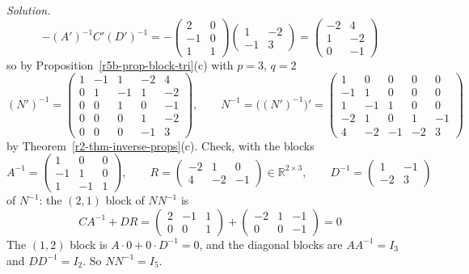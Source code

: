 \documentclass[12pt]{article}
\newcommand{\R}{\mathbb R}
\theoremstyle{definition}
\newenvironment{solution}{\par\noindent\textit{Solution.}\ }{\par\smallskip}
\begin{document}
\begin{solution}
\[-(A')^{-1}C'(D')^{-1}=-\begin{pmatrix}2&0\\-1&0\\1&1\end{pmatrix}\begin{pmatrix}1&-2\\-1&3\end{pmatrix}
=\begin{pmatrix}-2&4\\1&-2\\0&-1\end{pmatrix}
\]
so by Proposition~\ref{r5b-prop-block-tri}(c) with \(p=3\), \(q=2\)
\[
(N')^{-1}=\left(\begin{array}{ccc|cc}1&-1&1&-2&4\\0&1&-1&1&-2\\0&0&1&0&-1\\\hline0&0&0&1&-2\\0&0&0&-1&3\end{array}\right),\qquad
N^{-1}=\bigl((N')^{-1}\bigr)'=\left(\begin{array}{ccc|cc}1&0&0&0&0\\-1&1&0&0&0\\1&-1&1&0&0\\\hline-2&1&0&1&-1\\4&-2&-1&-2&3\end{array}\right)
\]
by Theorem~\ref{r2-thm-inverse-props}(c). Check, with the blocks
\[
A^{-1}=\begin{pmatrix}1&0&0\\-1&1&0\\1&-1&1\end{pmatrix},\qquad
R=\begin{pmatrix}-2&1&0\\4&-2&-1\end{pmatrix}\in\R^{2\times3},\qquad
D^{-1}=\begin{pmatrix}1&-1\\-2&3\end{pmatrix}
\]
of \(N^{-1}\): the
\((2,1)\) block of \(NN^{-1}\) is
\[
CA^{-1}+DR=\begin{pmatrix}2&-1&1\\0&0&1\end{pmatrix}+\begin{pmatrix}-2&1&-1\\0&0&-1\end{pmatrix}=0
\]
The \((1,2)\) block is \(A\cdot0+0\cdot D^{-1}=0\), and the diagonal blocks are \(AA^{-1}=I_3\)
and \(DD^{-1}=I_2\). So \(NN^{-1}=I_5\).
\end{solution}
\end{document}

